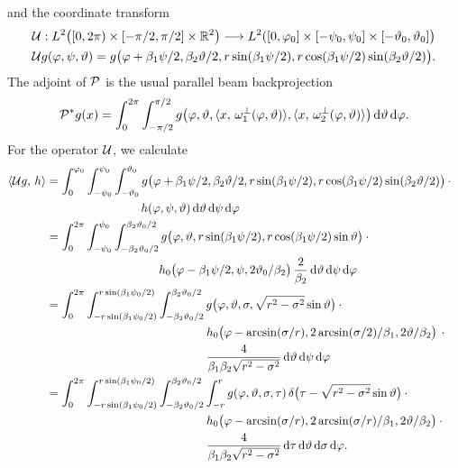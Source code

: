 \documentclass{amsart}
\renewcommand*{\phi}{\varphi}
\begin{document}
%
and the coordinate transform
%
\begin{align}
 &\OPU: L^2\big( [0, 2\pi) \times [-\pi/2, \pi/2] \times \RR^2 \big) \Lto L^2([0, \phi_0] \times [-\psi_0, \psi_0] \times 
 [-\vartheta_0, \vartheta_0] \big) \notag \\
 \label{eq:conecurved:coord_op}
 &\OPU g(\phi, \psi, \vartheta) = g\big( \phi + \beta_1\psi/2, \beta_2\vartheta/2, r\sin(\beta_1\psi/2), r \cos(\beta_1\psi/2) 
 \sin(\beta_2\vartheta/2) \big).
\end{align}
%
The adjoint of ${\mathcal{P}}$ is the usual parallel beam backprojection
%
\begin{equation}
 \label{eq:conecurved:xray_backproj}
 \DUALOPP g(x) = \int_0^{2\pi} \int_{-\pi/2}^{\pi/2} g\big( \phi, \vartheta, \INNER{x}{\omega_1^\perp(\phi, \vartheta)}, 
 \INNER{x}{\omega_2^\perp(\phi, \vartheta)} \big)\, \D\vartheta\, \D\phi.
\end{equation} 
%
For the operator ${\mathcal{U}}$, we calculate
%
\begin{align*}
 \INNER{\OPU g}{h}
 &= \int_0^{\phi_0} \int_{-\psi_0}^{\psi_0} \int_{-\vartheta_0}^{\vartheta_0} g\big( \phi + \beta_1\psi/2, \beta_2\vartheta/2, 
 r\sin(\beta_1\psi/2), r \cos(\beta_1\psi/2) \sin(\beta_2\vartheta/2) \big) \cdot \phantom{x} \\
 &\hspace{80pt} h(\phi, \psi, \vartheta)\, \D\vartheta\, \D\psi\, \D\phi \\
 &= \int_0^{2\pi} \int_{-\psi_0}^{\psi_0} \int_{-\beta_2\vartheta_0/2}^{\beta_2\vartheta_0/2} g\big( \phi, \vartheta, 
 r\sin(\beta_1\psi/2), r \cos(\beta_1\psi/2) \sin\vartheta \big) \cdot \phantom{x} \\
 &\hspace{95pt} h_0\big( \phi - \beta_1\psi/2, \psi, 2\vartheta_0/\beta_2 \big)\, 
 \frac{2}{\beta_2}\, \D\vartheta\, \D\psi\, \D\phi \\
 &= \int_0^{2\pi} \int_{-r\sin(\beta_1\psi_0/2)}^{r\sin(\beta_1\psi_0/2)} \int_{-\beta_2\vartheta_0/2}^{\beta_2\vartheta_0/2}
 g\big( \phi, \vartheta, \sigma, \sqrt{r^2 - \sigma^2} \sin\vartheta \big) \cdot \phantom{x} \\
 &\hspace{135pt} h_0\big( \phi - \arcsin(\sigma/r), 2\arcsin(\sigma/2)/\beta_1, 2\vartheta/\beta_2 \big)\, \cdot \phantom{x} \\
 &\hspace{135pt} \frac{4}{\beta_1\beta_2\sqrt{r^2 - \sigma^2}}\, \D\vartheta\, \D\psi\, \D\phi \\
 &= \int_0^{2\pi} \int_{-r\sin(\beta_1\psi_0/2)}^{r\sin(\beta_1\psi_0/2)} \int_{-\beta_2\vartheta_0/2}^{\beta_2\vartheta_0/2} \int_{-r}^r
 g(\phi, \vartheta, \sigma, \tau)\, \delta\big(\tau - \sqrt{r^2 - \sigma^2} \sin\vartheta \big) \cdot \phantom{x} \\
 &\hspace{135pt} h_0\big( \phi - \arcsin(\sigma/r), 2\arcsin(\sigma/r)/\beta_1, 2\vartheta/\beta_2 \big) \cdot \phantom{x} \\
 &\hspace{135pt} \frac{4}{\beta_1\beta_2\sqrt{r^2 - \sigma^2}}\, \D\tau\, \D\vartheta\, \D\sigma\, \D\phi.
\end{align*}
\end{document}
